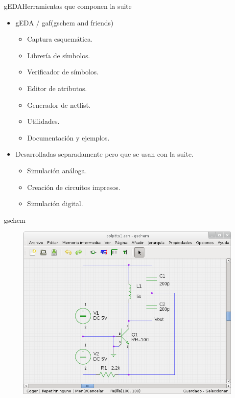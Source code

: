 \documentclass{beamer}
\begin{document}
\begin{frame}{gEDA}{Herramientas que componen la suite}
  \begin{itemize}
  \item gEDA / gaf(gschem and friends)
      \begin{itemize}
      \item Captura esquemática.
      \item Librería de símbolos.
      \item Verificador de símbolos.
      \item Editor de atributos.
      \item Generador de netlist.
      \item Utilidades.
      \item Documentación y ejemplos.
      \end{itemize}
    \item Desarrolladas separadamente pero que se usan con la suite.
      \begin{itemize}
      \item Simulación análoga.
      \item Creación de circuitos impresos.
      \item Simulación digital.
      \end{itemize}
  \end{itemize}
\end{frame}

\begin{frame}{gschem}
  \begin{figure}
    \centering
    \includegraphics[scale=0.5]{geda/img/gschem/gschem-colpitts.png}
  \end{figure}
\end{frame}
\end{document}
